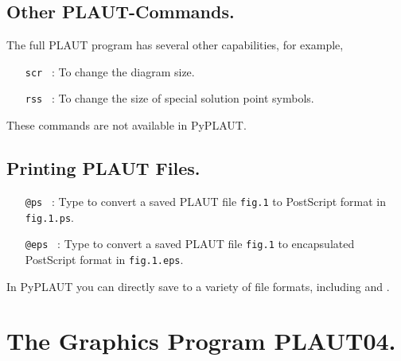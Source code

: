 \documentclass[12pt]{report}
\begin{document}
\section{ Other {\cal PLAUT}-Commands.} \label{sec:Other_PLAUT_commands}
The full {\cal PLAUT} program has several other capabilities, for example,

\begin{itemize}
\item[\tt scr]~:  To change the diagram size.
\item[\tt rss]~:  To change the size of special solution point symbols.
\end{itemize}

These commands are not available in {\cal PyPLAUT}.

\section{ Printing {\cal PLAUT} Files.} \label{sec:Printing_PLAUT_files}
\begin{itemize}
\item[\tt @ps]~:
  Type  to convert a saved {\cal PLAUT} file {\tt fig.1} 
  to {\cal PostScript} format
  in {\tt fig.1.ps}.

\item[\tt @eps]~:
  Type  to convert a saved {\cal PLAUT} file {\tt fig.1} 
  to encapsulated {\cal PostScript} format
  in {\tt fig.1.eps}.
\end{itemize}
In {\cal PyPLAUT} you can directly save to a variety of file
formats, including  and .

 
\chapter{ The Graphics Program PLAUT04.} \label{ch:PLAUT04}

\newcommand{\PLAUT} {\textsc{Plaut04}}
\newcommand{\ETC} {\textit{etc.}}


\end{document}
